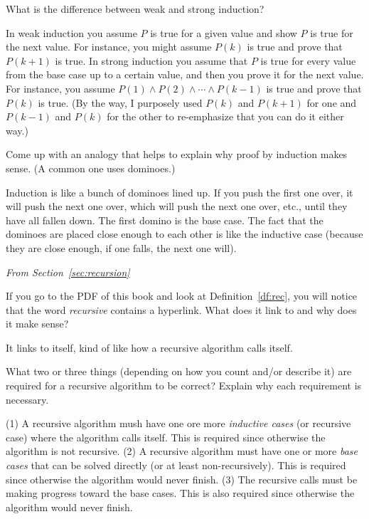 \begin{requ}
What is the difference between weak and strong induction?
\begin{requanswer}
In weak induction you assume $P$ is true for a given value and show $P$ is true for the next value.
For instance, you might assume $P(k)$ is true and prove that $P(k+1)$ is true.
In strong induction you assume that $P$ is true for every value from the base case up to a certain value,
and then you prove it for the next value. 
For instance, you assume $P(1)\wedge P(2)\wedge\cdots \wedge P(k-1)$ is true
and prove that $P(k)$ is true.
(By the way, I purposely used $P(k)$ and $P(k+1)$ for one and $P(k-1)$ and $P(k)$ for the other 
to re-emphasize that you can do it either way.)
\end{requanswer}
\end{requ}

\begin{requ}
Come up with an analogy that helps to explain why proof by induction makes sense.
(A common one uses dominoes.)
\begin{requanswer}
Induction is like a bunch of dominoes lined up. If you push the first one over, it will push the next one over, which will push
the next one over, etc., until they have all fallen down. The first domino is the base case. The fact that the dominoes
are placed close enough to each other is like the inductive case (because they are close enough, if one falls, the next one will).
\end{requanswer}
\end{requ}

\noindent
{\em From Section~\ref{sec:recursion}}

\begin{requ}
If you go to the PDF of this book and look at Definition~\ref{df:rec}, you will notice that the word
{\em recursive} contains a hyperlink. What does it link to and why does it make sense?
\begin{requanswer}
It links to itself, kind of like how a recursive algorithm calls itself.
\end{requanswer}
\end{requ}

\begin{requ}
What two or three things (depending on how you count and/or describe it) are required for a
recursive algorithm to be correct? Explain why each requirement is necessary.
\begin{requanswer}
(1) A recursive algorithm mush have one ore more {\em inductive cases} (or recursive case) where the algorithm calls itself.
This is required since otherwise the algorithm is not recursive.
(2) A recursive algorithm must have one or more {\em base cases} that can be solved directly (or at least non-recursively).
This is required since otherwise the algorithm would never finish.
(3) The recursive calls must be making progress toward the base cases.
This is also required since otherwise the algorithm would never finish.
\end{requanswer}
\end{requ}

